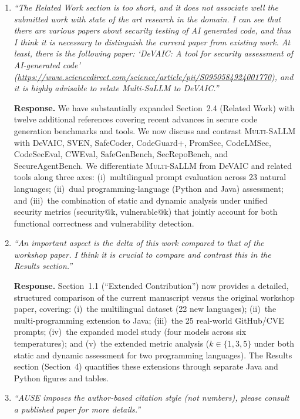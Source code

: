 \documentclass[12pt]{article}
\newcommand{\sandoval}{\textsc{Multi-SaLLM}}
\begin{document}
\begin{enumerate}[leftmargin=*, label=\textbf{R3.\arabic*.}]
\item \textit{``The Related Work section is too short, and it does not associate well
the submitted work with state of the art research in the domain. I can see that there
are various papers about security testing of AI generated code, and thus I think it is
necessary to distinguish the current paper from existing work. At least, there is the
following paper: `DeVAIC: A tool for security assessment of AI-generated code'
(\url{https://www.sciencedirect.com/science/article/pii/S0950584924001770}), and it
is highly advisable to relate Multi-SaLLM to DeVAIC.''}

\textbf{Response.}
We have substantially expanded Section~2.4 (Related Work) with twelve additional
references covering recent advances in secure code generation benchmarks and
tools. We now discuss and contrast \sandoval{} with DeVAIC, SVEN, SafeCoder,
CodeGuard+, PromSec, CodeLMSec, CodeSecEval, CWEval, SafeGenBench,
SecRepoBench, and SecureAgentBench. We differentiate \sandoval{} from DeVAIC
and related tools along three axes: (i)~multilingual prompt evaluation across 23
natural languages; (ii)~dual programming-language (Python and Java) assessment;
and (iii)~the combination of static and dynamic analysis under unified security
metrics (security@k, vulnerable@k) that jointly account for both functional
correctness and vulnerability detection.

\item \textit{``An important aspect is the delta of this work compared to that of the
workshop paper. I think it is crucial to compare and contrast this in the Results
section.''}

\textbf{Response.}
Section~1.1 (``Extended Contribution'') now provides a detailed, structured
comparison of the current manuscript versus the original workshop paper, covering:
(i)~the multilingual dataset (22 new languages); (ii)~the multi-programming
extension to Java; (iii)~the 25 real-world GitHub/CVE prompts; (iv)~the expanded
model study (four models across six temperatures); and (v)~the extended metric
analysis ($k \in \{1,3,5\}$ under both static and dynamic assessment for two
programming languages). The Results section (Section~4) quantifies these
extensions through separate Java and Python figures and tables.

\item \textit{``AUSE imposes the author-based citation style (not numbers), please
consult a published paper for more details.''}


\end{enumerate}
\end{document}
